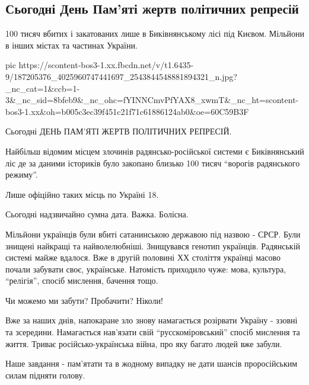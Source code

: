  
 
 
 
 
\subsection{Сьогодні День Пам'яті жертв політичних репресій}

100 тисяч вбитих і закатованих лише в Биківнянському лісі під Києвом. Мільйони в інших містах та частинах України.

\ifcmt
  pic https://scontent-bos3-1.xx.fbcdn.net/v/t1.6435-9/187205376_4025960747441697_2543844548881894321_n.jpg?_nc_cat=1&ccb=1-3&_nc_sid=8bfeb9&_nc_ohc=fYINNCmvPfYAX8_xwmT&_nc_ht=scontent-bos3-1.xx&oh=b005c3ec39f451c21f71c61886124ab0&oe=60C59B3F
\fi

Сьогодні ДЕНЬ ПАМ'ЯТІ ЖЕРТВ ПОЛІТИЧНИХ РЕПРЕСІЙ.

Найбільш відомим місцем злочинів радянсько-російської системи є Биківнянський
ліс де за даними істориків було закопано близько 100 тисяч \enquote{ворогів радянського
режиму}. 

Лише офіційно таких місць по Україні 18.

Сьогодні надзвичайно сумна дата. Важка. Болісна. 

Мільйони українців були вбиті сатанинською державою під назвою - СРСР. Були
знищені найкращі та найволелюбніші. Знищувався генотип українців. Радянській
системі майже вдалося. Вже в другій половині ХХ століття українці масово почали
забувати своє, українське. Натомість приходило чуже: мова, культура, \enquote{релігія},
спосіб мислення, бачення тощо.

Чи можемо ми забути? Пробачити? Ніколи!

Вже за наших днів, напокаране зло знову намагається розірвати Україну - ззовні
та зсередини. Намагається нав'язати свій \enquote{русскоміровський} спосіб мислення та
життя. Триває російсько-українська війна, про яку багато людей вже забули.

Наше завдання - пам'ятати та в жодному випадку не дати шансів проросійським силам підняти голову. 

